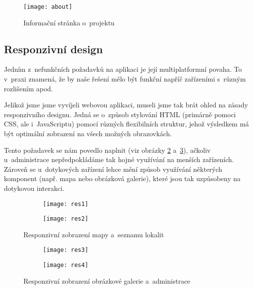 \begin{figure}
    \centering
    \texttt{[image: about]}  
    \caption{Informační stránka o~projektu}
    \label{about}
\end{figure}

\hypertarget{responzivnuxed-design}{%
\subsection{Responzivní design}\label{responzivnuxed-design}}

Jedním z~nefunkčních požadavků na aplikaci je její multiplatformní povaha. To v~praxi znamená, že by naše řešení mělo být funkční napříč zařízeními s~různým rozlišením apod.

Jelikož jsme jsme vyvíjeli webovou aplikaci, museli jsme tak brát ohled na zásady responzivního designu. Jedná se o~způsob stylování HTML (primárně pomoci CSS, ale i~JavaScriptu) pomocí různých flexibilních struktur, jehož výsledkem má být optimální zobrazení na všech možných obrazovkách.

Tento požadavek se nám povedlo naplnit (viz obrázky \ref{resA} a~\ref{resB}), ačkoliv u~administrace nepředpokládáme tak hojné využívání na menších zařízeních. Zároveň se u~dotykových zařízení lehce mění způsob využívání některých komponent (např. mapa nebo obrázková galerie), které jsou tak uzpůsobeny na dotykovou interakci.

\begin{figure}
  \begin{subfigure}[b]{0.4\textwidth}
    \texttt{[image: res1]}
  \end{subfigure}
  \hfill
  \begin{subfigure}[b]{0.4\textwidth}
    \texttt{[image: res2]}
  \end{subfigure}
  \caption{Responzivní zobrazení mapy a~seznamu lokalit}
  \label{resA}
\end{figure}

\begin{figure}
  \begin{subfigure}[b]{0.4\textwidth}
    \texttt{[image: res3]}
  \end{subfigure}
  \hfill
  \begin{subfigure}[b]{0.4\textwidth}
    \texttt{[image: res4]}
  \end{subfigure}
  \caption{Responzivní zobrazení obrázkové galerie a~administrace}
  \label{resB}
\end{figure}
